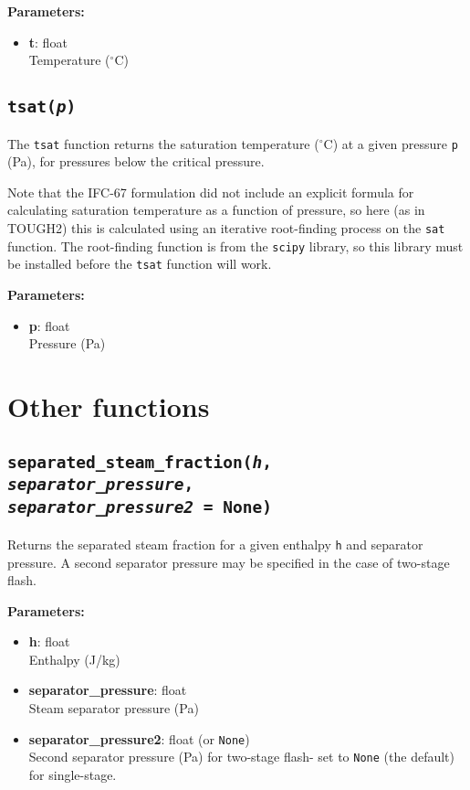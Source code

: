 \textbf{Parameters:}
\begin{itemize}
\item \textbf{t}: float\\
  Temperature ($^{\circ}$C)
\end{itemize}

\subsection{\texttt{tsat(\emph{p})}}

The \texttt{tsat} function returns the saturation temperature ($^{\circ}$C) at a given pressure \texttt{p} (Pa), for pressures below the critical pressure.

Note that the IFC-67 formulation did not include an explicit formula for calculating saturation temperature as a function of pressure, so here (as in TOUGH2) this is calculated using an iterative root-finding process on the \texttt{sat} function.  The root-finding function is from the \texttt{scipy} library, so this library must be installed before the \texttt{tsat} function will work.

\textbf{Parameters:}
\begin{itemize}
\item \textbf{p}: float\\
  Pressure (Pa)
\end{itemize}

\section{Other functions}

\subsection{\texttt{separated\_steam\_fraction(\emph{h}, \emph{separator\_pressure},\\
    \emph{separator\_pressure2} = None)}}

Returns the separated steam fraction for a given enthalpy \texttt{h} and separator pressure.  A second separator pressure may be specified in the case of two-stage flash.

\textbf{Parameters:}
\begin{itemize}
\item \textbf{h}: float\\
  Enthalpy (J/kg)
\item \textbf{separator\_pressure}: float\\
  Steam separator pressure (Pa)
\item \textbf{separator\_pressure2}: float (or \texttt{None})\\
  Second separator pressure (Pa) for two-stage flash- set to \texttt{None} (the default) for single-stage.
\end{itemize}

